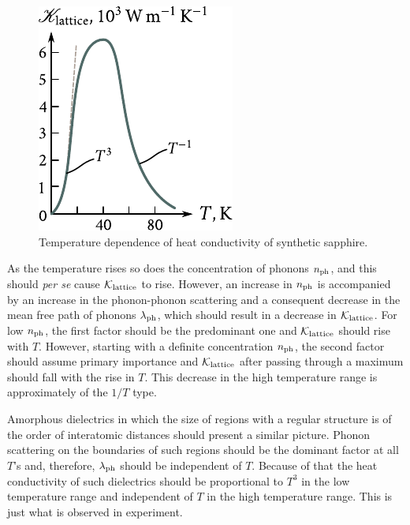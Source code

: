 \begin{figure}[t]
	\begin{center}
		\includegraphics[scale=1]{figures/ch_04/fig_4_9.pdf}
		\caption[]{Temperature dependence of heat conductivity of synthetic sapphire.}
		\label{fig:4_9}
	\end{center}
	\vspace{-0.7cm}
\end{figure}

As the temperature rises so does the concentration of phonons $n_{\text{ph}}$, and this should \textit{per se} cause $\mathcal{K}_{\text{lattice}}$ to rise. However, an increase in $n_{\text{ph}}$ is accompanied by an increase in the phonon-phonon scattering and a consequent decrease in the mean free path of phonons $\lambda_{\text{ph}}$, which should result in a decrease in $\mathcal{K}_{\text{lattice}}$. For low $n_{\text{ph}}$, the first factor should be the predominant one and $\mathcal{K}_{\text{lattice}}$ should rise with $T$.
However, starting with a definite concentration $n_{\text{ph}}$, the second factor should assume primary importance and $\mathcal{K}_{\text{lattice}}$ after passing through a maximum should fall with the rise in $T$. This decrease in the high temperature range is approximately of the $1/T$ type.

Amorphous dielectrics in which the size of regions with a regular structure is of the order of interatomic distances should present a similar picture. Phonon scattering on the boundaries of such regions should be the dominant factor at all $T$'s and, therefore, $\lambda_{\text{ph}}$ should be
independent of $T$. Because of that the heat conductivity of such dielectrics should be proportional to $T^3$ in the low temperature range and independent of $T$ in the high temperature range. This is just what is observed in experiment.

